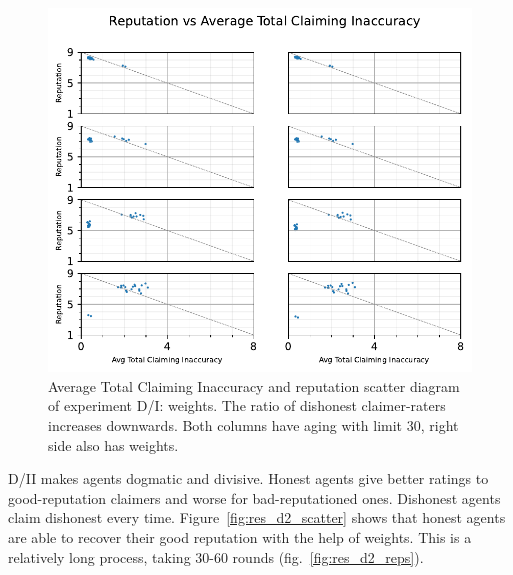 \documentclass[%
    ]{\PathToTumTemplate/thesis/tum_thesis}
\begin{document}
\begin{figure}[tbp]
  \begin{center}
        \includegraphics[width=0.75\linewidth]	{../results/d/AvgTotClaimInaccuracyAndReputationScatter_joined.pdf}
    \caption{
    Average Total Claiming Inaccuracy and reputation scatter diagram of experiment D/I: weights.
    The ratio of dishonest claimer-raters increases downwards.
    Both columns have aging with limit 30, right side also has weights.
    }
    \label{fig:res_d_scatter}
  \end{center}
\end{figure}

D/II makes agents dogmatic and divisive.
Honest agents give better ratings to good-reputation claimers and worse for bad-reputationed ones.
Dishonest agents claim dishonest every time.
Figure~\ref{fig:res_d2_scatter} shows that honest agents are able to recover their good reputation with the help of weights.
This is a relatively long process, taking 30-60 rounds (fig.~\ref{fig:res_d2_reps}).
\end{document}
